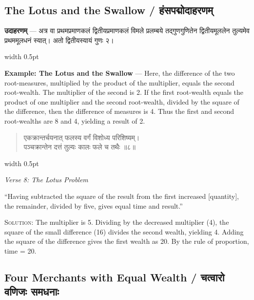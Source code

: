 \documentclass[11pt,a4paper]{article}
\newcommand{\vs}{\vspace{0.5em}}
\newenvironment{sanskritverse}{%
  \begin{quote}\devanagarifont\textcolor{versecolor}%
}{%
  \end{quote}
}
\newcommand{\bilingual}[2]{%
  \par\vspace{0.5em}%
  \noindent\begin{minipage}[t]{0.47\textwidth}%
  \setlength{\parindent}{0pt}%
  \small #1%
  \end{minipage}%
  \hfill\textcolor{columnrule}{\vrule width 0.5pt}\hfill%
  \begin{minipage}[t]{0.47\textwidth}%
  \setlength{\parindent}{0pt}%
  \small\raggedright #2%
  \end{minipage}%
  \par\vspace{0.5em}%
}
\begin{document}
\newpage

\subsection*{The Lotus and the Swallow / हंसपद्मोदाहरणम्}

\bilingual{\textbf{उदाहरणम्} — अत्र वा प्रथमप्रमाणकलं द्वितीयप्रमाणकलं विमले प्रलम्बये तद्गुणगुणितेन द्वितीयमूललेन तुल्यमेव प्रथममूलधनं स्यात्। अतो द्वितीयस्यायं गुणः २।
}{%
\textbf{Example: The Lotus and the Swallow} --- Here, the difference of the two root-measures, multiplied by the product of the multiplier, equals the second root-wealth. The multiplier of the second is 2. If the first root-wealth equals the product of one multiplier and the second root-wealth, divided by the square of the difference, then the difference of measures is 4. Thus the first and second root-wealths are 8 and 4, yielding a result of 2.}

\vs

\bilingual{\begin{sanskritverse}
एकक्रान्तर्चयनात् फलस्य वर्गं विशोध्य परिशिष्यम्।\\
पञ्चक्रान्तेन दत्तं तुल्यः कालः फले च तथैः ॥८॥
\end{sanskritverse}
}{%
\begin{flushright}
\textit{Verse 8: The Lotus Problem}
\end{flushright}
``Having subtracted the square of the result from the first increased [quantity], the remainder, divided by five, gives equal time and result.''

\vs
\textsc{Solution:} The multiplier is 5. Dividing by the decreased multiplier (4), the square of the small difference (16) divides the second wealth, yielding 4. Adding the square of the difference gives the first wealth as 20. By the rule of proportion, time = 20.}

\newpage

\subsection*{Four Merchants with Equal Wealth / चत्वारो वणिजः समधनाः}
\end{document}
